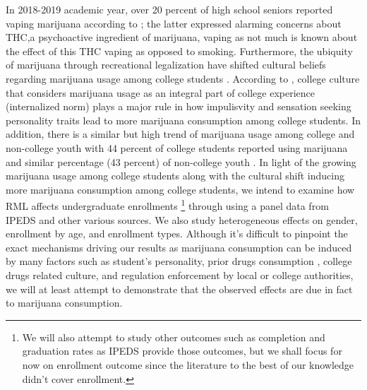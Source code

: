 \documentclass[12pt]{article}%
\begin{document}
In 2018-2019 academic year, over 20 percent of high school seniors reported vaping marijuana according to \cite{National_Institute_on_Drug_Abuse2019-wl}; the latter expressed alarming concerns about THC,a psychoactive ingredient of marijuana, vaping as not much is known about the effect of this THC vaping as opposed to smoking. Furthermore, the ubiquity of marijuana through recreational legalization have shifted cultural beliefs regarding marijuana usage among college students \citep{koval2019perceived}. According to \cite{pearson2018personality}, college culture that considers marijuana usage as an integral part of college experience (internalized norm) plays a major rule in how impulisvity and sensation seeking personality traits lead to more marijuana consumption among college students. In addition, there is a similar but high trend of marijuana usage among college and non-college youth with 44 percent of college students reported using marijuana and similar percentage (43 percent) of non-college youth \citep{schulenberg2021monitoring}.
In light of the growing marijuana usage among college students along with the cultural shift inducing more marijuana consumption among college students, we intend to examine how RML affects undergraduate enrollments 
\footnote{ We will also attempt to study other outcomes such as completion and graduation rates as IPEDS provide those outcomes, but we shall focus for now on enrollment outcome since the literature to the best of our knowledge didn't cover enrollment. }
through using a panel data from IPEDS and other various sources. We also study heterogeneous effects on gender, enrollment by age, and enrollment types. Although it's difficult to pinpoint the exact mechanisms driving our results as marijuana consumption can be induced by many factors such as student's personality, prior drugs consumption , college drugs related culture, and regulation enforcement by local or college authorities, we will at least attempt to demonstrate that the observed effects are due in fact to marijuana consumption. 
\end{document}
